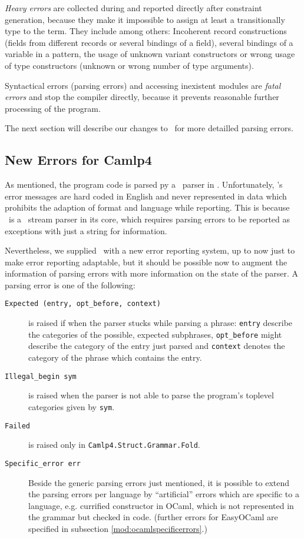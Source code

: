 \emph{Heavy errors} are collected during and reported directly after constraint
generation, because they make it impossible to assign at least a transitionally
type to the term. They include among others:
Incoherent record constructions (fields from different records or several
bindings of a field), several bindings of a variable in a pattern, the usage of
unknown variant constructors or wrong usage of type constructors (unknown or
wrong number of type arguments).

Syntactical errors (parsing errors) and accessing inexistent modules are
\emph{fatal errors} and stop the compiler directly, because it prevents
reasonable further processing of the program.

The next section will describe our changes to \camlpf\ for more detailled
parsing errors.

\subsection{New Errors for Camlp4}

As mentioned, the program code is parsed py a \camlpf\ parser in  \easyocaml.
Unfortunately, \camlpf's error messages are hard coded in English and never
represented in data which prohibits the adaption of format and language while
reporting.  This is because \camlpf\ is a \ocaml\ stream parser in its core,
which requires parsing errors to be reported as exceptions with just a string
for information.

Nevertheless, we supplied \camlpf\ with a new error reporting system, up 
to now just to make error reporting adaptable, but it should be possible 
now to augment the information of parsing errors with more information on the
state of the parser. A parsing error is one of
the following:

\begin{description}
    \item[\texttt{Expected~(entry,~opt\_before,~context)}] is raised 
        if when the parser stucks while parsing a phrase: \texttt{entry} 
        describe the categories of the possible, expected subphrases, 
        \texttt{opt\_before} might describe the category of the entry 
        just parsed and \texttt{context} denotes the category of the 
        phrase which contains the entry.
    \item[\texttt{Illegal\_begin~sym}] is raised when the parser is 
        not able to parse the program's toplevel categories given by
        \texttt{sym}.
    \item[\texttt{Failed}] is raised only in 
        \texttt{Camlp4.Struct.Grammar.Fold}.
    \item[\texttt{Specific\_error~err}] Beside the generic parsing 
        errors just mentioned, it is possible to extend the parsing 
        errors per language by ``artificial'' errors which are specific 
        to a language, e.g. currified constructor in OCaml, which is not
        represented in the grammar but checked in code.  (further errors for
        EasyOCaml are specified in subsection \ref{mod:ocamlspecificerrors}.)
\end{description}

